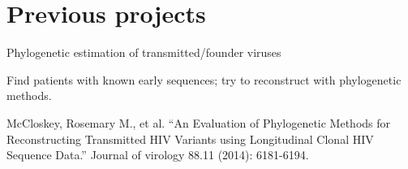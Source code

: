 \documentclass{beamer}
\begin{document}
\section{Previous projects}

\begin{frame}{Phylogenetic estimation of transmitted/founder viruses}
    \begin{center}
\end{center}

    Find patients with known early sequences; try to reconstruct with
    phylogenetic methods.

    \tiny
    McCloskey, Rosemary M., et al. ``An Evaluation of Phylogenetic Methods for
    Reconstructing Transmitted HIV Variants using Longitudinal Clonal HIV
    Sequence Data.'' Journal of virology 88.11 (2014): 6181-6194.\par
\end{frame}
\end{document}
